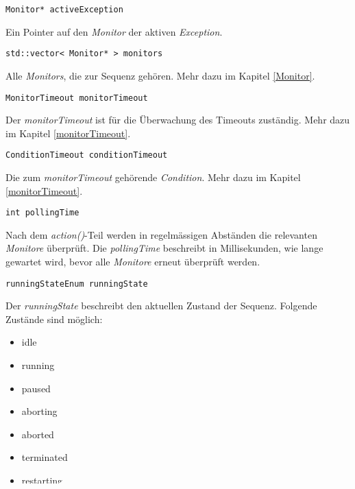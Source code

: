 \begin{lstlisting}
Monitor* activeException
\end{lstlisting}
Ein Pointer auf den \textit{Monitor} der aktiven \textit{Exception}.


\begin{lstlisting}
std::vector< Monitor* > monitors
\end{lstlisting}
Alle \textit{Monitors}, die zur Sequenz gehören.
Mehr dazu im Kapitel \ref{Monitor}.


\begin{lstlisting}
MonitorTimeout monitorTimeout
\end{lstlisting}
Der \textit{monitorTimeout} ist für die Überwachung des Timeouts zuständig.
Mehr dazu im Kapitel \ref{monitorTimeout}.


\begin{lstlisting}
ConditionTimeout conditionTimeout
\end{lstlisting}
Die zum \textit{monitorTimeout} gehörende \textit{Condition}.
Mehr dazu im Kapitel \ref{monitorTimeout}.



\begin{lstlisting}
int pollingTime
\end{lstlisting}
Nach dem \textit{action()}-Teil werden in regelmässigen Abständen die relevanten \textit{Monitore} überprüft.
Die \textit{pollingTime} beschreibt in Millisekunden, wie lange gewartet wird, bevor alle \textit{Monitore} erneut überprüft werden.


\begin{lstlisting}
runningStateEnum runningState
\end{lstlisting}
Der \textit{runningState} beschreibt den aktuellen Zustand der Sequenz.
Folgende Zustände sind möglich:
\begin{itemize}
\item idle
\item running
\item paused
\item aborting
\item aborted
\item terminated
\item restarting
\end{itemize}
Besonders in der Methode \textit{actionFramework()} spielt der \textit{runningState} eine grosse Rolle.



\subsection{Virtuelle Methoden}
\begin{lstlisting}
virtual int start() = 0
\end{lstlisting}
Diese Methode wird aufgerufen, wenn die Sequenz gestartet wird.
Sie ruft die Methode \textit{actionFramework()} auf.
Die Methode wird von den abgeleiteten Klassen \textit{Step} und \textit{Sequence} überschrieben.


